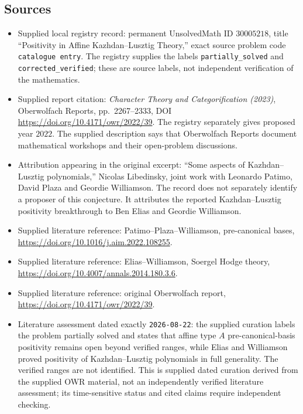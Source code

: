 \documentclass[11pt]{article}
\begin{document}
\subsection{Sources}
\begin{itemize}
\item Supplied local registry record: permanent UnsolvedMath ID \(30005218\), title ``Positivity in Affine Kazhdan--Lusztig Theory,'' exact source problem code \texttt{catalogue entry}. The registry supplies the labels \texttt{partially\_solved} and \texttt{corrected\_verified}; these are source labels, not independent verification of the mathematics.
\item Supplied report citation: \emph{Character Theory and Categorification (2023)}, Oberwolfach Reports, pp.\ 2267--2333, DOI \url{https://doi.org/10.4171/owr/2022/39}. The registry separately gives proposed year \(2022\). The supplied description says that Oberwolfach Reports document mathematical workshops and their open-problem discussions.
\item Attribution appearing in the original excerpt: ``Some aspects of Kazhdan--Lusztig polynomials,'' Nicolas Libedinsky, joint work with Leonardo Patimo, David Plaza and Geordie Williamson. The record does not separately identify a proposer of this conjecture. It attributes the reported Kazhdan--Lusztig positivity breakthrough to Ben Elias and Geordie Williamson.
\item Supplied literature reference: Patimo--Plaza--Williamson, pre-canonical bases, \url{https://doi.org/10.1016/j.aim.2022.108255}.
\item Supplied literature reference: Elias--Williamson, Soergel Hodge theory, \url{https://doi.org/10.4007/annals.2014.180.3.6}.
\item Supplied literature reference: original Oberwolfach report, \url{https://doi.org/10.4171/owr/2022/39}.
\item Literature assessment dated exactly \texttt{2026-08-22}: the supplied curation labels the problem partially solved and states that affine type \(A\) pre-canonical-basis positivity remains open beyond verified ranges, while Elias and Williamson proved positivity of Kazhdan--Lusztig polynomials in full generality. The verified ranges are not identified. This is supplied dated curation derived from the supplied OWR material, not an independently verified literature assessment; its time-sensitive status and cited claims require independent checking.
\end{itemize}
\end{document}
